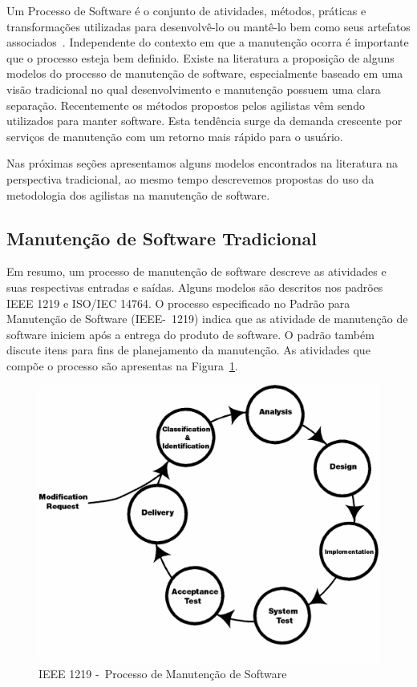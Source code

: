 Um Processo de Software é o conjunto de atividades, métodos, práticas e
transformações utilizadas para desenvolvê-lo ou mantê-lo bem como seus artefatos
associados~\cite{paulk1993key}. Independente do contexto em que a manutenção
ocorra é importante que o processo esteja bem definido. Existe na literatura a
proposição de alguns modelos do processo de manutenção de software,
especialmente baseado em uma visão tradicional no qual desenvolvimento e
manutenção possuem uma clara separação. Recentemente os métodos propostos pelos
agilistas vêm sendo utilizados para manter software. Esta tendência surge da
demanda crescente por serviços de manutenção com um retorno mais rápido para o
usuário.

Nas próximas seções apresentamos alguns modelos encontrados na literatura na
perspectiva tradicional, ao mesmo tempo descrevemos propostas do uso da
metodologia dos agilistas na manutenção de software.

\subsection{Manutenção de Software Tradicional}
\label{subsec:manutenção_de_software_tradicional}

Em resumo, um processo de manutenção de software descreve as atividades e suas
respectivas entradas e saídas. Alguns modelos são descritos nos padrões IEEE
1219 e ISO/IEC 14764. O processo especificado no Padrão para Manutenção de
Software (IEEE-~1219) indica que as atividade de manutenção de software iniciem
após a entrega do produto de software. O padrão também discute itens para fins
de planejamento da manutenção. As atividades que compõe o processo são
apresentas na Figura~\ref{fig:ieee-1219-processo-man-software}.

\begin{figure}[htpb] \centering
	\includegraphics[width=0.7\linewidth]
	{chapter-manutencao-software-visao-geral/img/ieee-1219-98-processo-manutencao.png}
	\caption{IEEE 1219 -~Processo de Manutenção de Software}\label{fig:ieee-1219-processo-man-software}
\end{figure}

